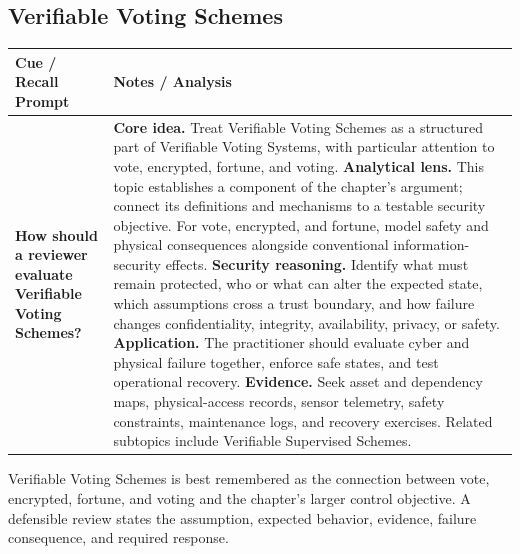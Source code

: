 \documentclass[11pt]{article}
\newcommand{\CornellHeader}{%
\rowcolor{Navy}\color{white}\bfseries Cue / Recall Prompt & \color{white}\bfseries Notes / Analysis\\\hline}
\newcommand{\CornellRow}[2]{%
\cellcolor{CueGray}\RaggedRight\textbf{#1} & \RaggedRight #2\\\hline}
\begin{document}
\subsection*{Verifiable Voting Schemes}
\begin{longtable}{>{\RaggedRight\arraybackslash}p{}|>{\RaggedRight\arraybackslash}p{}}
\CornellHeader
\CornellRow{How should a reviewer evaluate Verifiable Voting Schemes?}{\textbf{Core idea.} Treat Verifiable Voting Schemes as a structured part of Verifiable Voting Systems, with particular attention to vote, encrypted, fortune, and voting. \textbf{Analytical lens.} This topic establishes a component of the chapter's argument; connect its definitions and mechanisms to a testable security objective. For vote, encrypted, and fortune, model safety and physical consequences alongside conventional information-security effects. \textbf{Security reasoning.} Identify what must remain protected, who or what can alter the expected state, which assumptions cross a trust boundary, and how failure changes confidentiality, integrity, availability, privacy, or safety. \textbf{Application.} The practitioner should evaluate cyber and physical failure together, enforce safe states, and test operational recovery. \textbf{Evidence.} Seek asset and dependency maps, physical-access records, sensor telemetry, safety constraints, maintenance logs, and recovery exercises. Related subtopics include Verifiable Supervised Schemes.}
\end{longtable}
\begin{topicsummary}
Verifiable Voting Schemes is best remembered as the connection between vote, encrypted, fortune, and voting and the chapter's larger control objective. A defensible review states the assumption, expected behavior, evidence, failure consequence, and required response.
\end{topicsummary}
\end{document}
